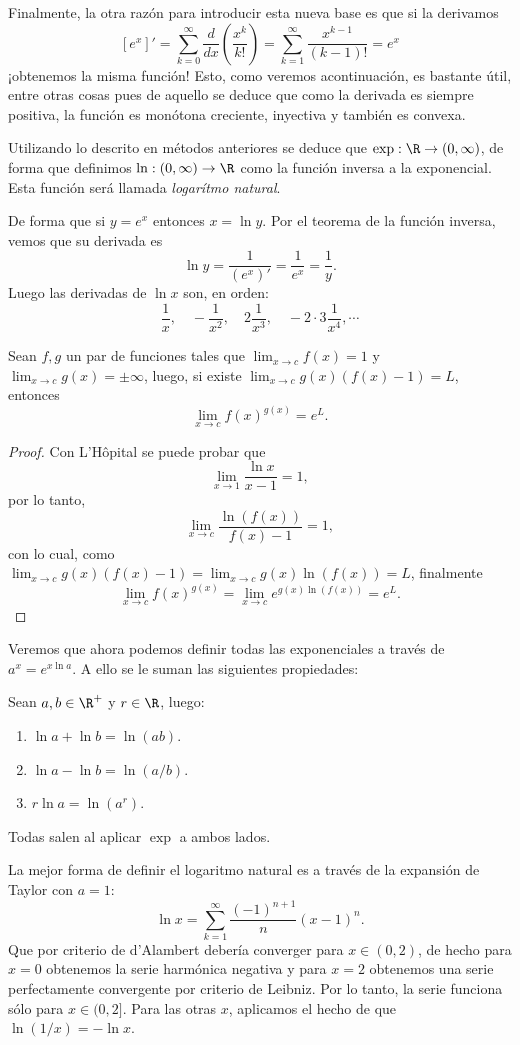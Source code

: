 \documentclass[11pt,oneside,a4paper]{book}
\begin{document}
Finalmente, la otra razón para introducir esta nueva base es que si la derivamos
$$[e^x]'=\sum_{k=0}^\infty\frac{d}{dx}\left(\frac{x^k}{k!}\right)=\sum_{k=1}^\infty\frac{x^{k-1}}{(k-1)!}=e^x$$
¡obtenemos la misma función! Esto, como veremos acontinuación, es bastante útil, entre otras cosas pues de aquello se deduce que como la derivada es siempre positiva, la función es monótona creciente, inyectiva y también es convexa.
\begin{mydef}
Utilizando lo descrito en métodos anteriores se deduce que $\exp:\R\rightarrow(0,\infty)$, de forma que definimos $\ln:(0,\infty)\rightarrow\R$ como la función inversa a la exponencial. Esta función será llamada \textit{logarítmo natural}.
\end{mydef}
De forma que si $y=e^x$ entonces $x=\ln y$. Por el teorema de la función inversa, vemos que su derivada es
$$\ln y=\frac{1}{(e^x)'}=\frac{1}{e^x}=\frac{1}{y}.$$
Luego las derivadas de $\ln x$ son, en orden:
$$\frac{1}{x},\quad -\frac{1}{x^2},\quad 2\frac{1}{x^3},\quad -2\cdot 3\frac{1}{x^4},\cdots$$
\begin{thm}
Sean $f, g$ un par de funciones tales que $\lim_{x\to c}f(x)=1$ y $\lim_{x\to c}g(x)=\pm\infty$, luego, si existe $\lim_{x\to c}g(x)(f(x)-1)=L$, entonces
$$\lim_{x\to c}f(x)^{g(x)}=e^L.$$
\end{thm}
\begin{proof}
Con L'Hôpital se puede probar que
$$\lim_{x\to 1}\frac{\ln x}{x-1}=1,$$
por lo tanto,
$$\lim_{x\to c}\frac{\ln(f(x))}{f(x)-1}=1,$$
con lo cual, como $\lim_{x\to c}g(x)(f(x)-1)=\lim_{x\to c}g(x)\ln(f(x))=L$, finalmente
$$\lim_{x\to c}f(x)^{g(x)}=\lim_{x\to c}e^{g(x)\ln(f(x))}=e^L.$$
\end{proof}
Veremos que ahora podemos definir todas las exponenciales a través de $a^x=e^{x\ln a}$. A ello se le suman las siguientes propiedades:
\begin{prop}
Sean $a,b\in\R^+$ y $r\in\R$, luego:
\begin{enumerate}[$a)$]
\item $\ln a+\ln b=\ln(ab)$.
\item $\ln a-\ln b=\ln(a/b)$.
\item $r\ln a=\ln(a^r)$.
\end{enumerate}
\end{prop}
Todas salen al aplicar $\exp$ a ambos lados.

La mejor forma de definir el logaritmo natural es a través de la expansión de Taylor con $a=1$:
$$\ln x=\sum_{k=1}^\infty\frac{(-1)^{n+1}}{n}(x-1)^n.$$
Que por criterio de d'Alambert debería converger para $x\in(0,2)$, de hecho para $x=0$ obtenemos la serie harmónica negativa y para $x=2$ obtenemos una serie perfectamente convergente por criterio de Leibniz. Por lo tanto, la serie funciona sólo para $x\in(0,2]$. Para las otras $x$, aplicamos el hecho de que $\ln(1/x)=-\ln x$.
\end{document}
